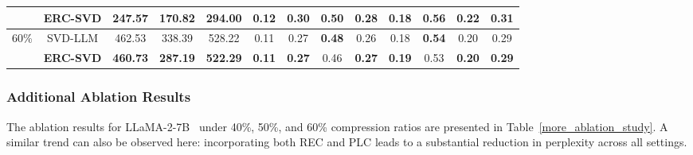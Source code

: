 \begin{table}[t]
{\begin{tabular}{c|c|ccc|cccccccc}
                               & \cellcolor{cyan!10} \textbf{ERC-SVD} & \cellcolor{cyan!10} \textbf{247.57} & \cellcolor{cyan!10} \textbf{170.82} & \cellcolor{cyan!10} \textbf{294.00} & \cellcolor{cyan!10} \textbf{0.12} & \cellcolor{cyan!10} \textbf{0.30} & \cellcolor{cyan!10} \textbf{0.50} & \cellcolor{cyan!10} \textbf{0.28} & \cellcolor{cyan!10} \textbf{0.18} & \cellcolor{cyan!10} \textbf{0.56} & \cellcolor{cyan!10} \textbf{0.22} & \cellcolor{cyan!10} \textbf{0.31} \\
    \midrule
    \multirow{2}{*}{60\%}
                               & \cellcolor{white} SVD-LLM & \cellcolor{white} 462.53 & \cellcolor{white} 338.39 & \cellcolor{white} 528.22 & \cellcolor{white} 0.11 & \cellcolor{white} 0.27 & \cellcolor{white} \textbf{0.48} & \cellcolor{white} 0.26 & \cellcolor{white} 0.18 & \cellcolor{white} \textbf{0.54} & \cellcolor{white} 0.20 & \cellcolor{white} 0.29 \\
                               
                               & \cellcolor{cyan!10} \textbf{ERC-SVD} & \cellcolor{cyan!10} \textbf{460.73} & \cellcolor{cyan!10} \textbf{287.19} & \cellcolor{cyan!10} \textbf{522.29} & \cellcolor{cyan!10} \textbf{0.11} & \cellcolor{cyan!10} \textbf{0.27} & \cellcolor{cyan!10} 0.46 & \cellcolor{cyan!10} \textbf{0.27} & \cellcolor{cyan!10} \textbf{0.19} & \cellcolor{cyan!10} 0.53 & \cellcolor{cyan!10} \textbf{0.20} & \cellcolor{cyan!10} \textbf{0.29} \\

    \bottomrule
\end{tabular}
}
\end{table}

\subsubsection{Additional Ablation Results} \label{ablation_study_50_60}
The ablation results for LLaMA-2-7B~\cite{touvron2023llama2} under 40\%, 50\%, and 60\% compression ratios are presented in Table~\ref{more_ablation_study}.
A similar trend can also be observed here: incorporating both REC and PLC leads to a substantial reduction in perplexity across all settings.


